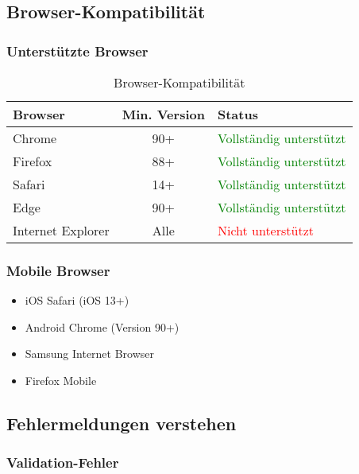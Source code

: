 \subsection{Browser-Kompatibilität}

\subsubsection{Unterstützte Browser}

\begin{table}[H]
    \centering
    \begin{tabular}{|l|c|l|}
        \hline
        \textbf{Browser} & \textbf{Min. Version} & \textbf{Status} \\
        \hline
        Chrome & 90+ & \textcolor{green}{Vollständig unterstützt} \\
        Firefox & 88+ & \textcolor{green}{Vollständig unterstützt} \\
        Safari & 14+ & \textcolor{green}{Vollständig unterstützt} \\
        Edge & 90+ & \textcolor{green}{Vollständig unterstützt} \\
        Internet Explorer & Alle & \textcolor{red}{Nicht unterstützt} \\
        \hline
    \end{tabular}
    \caption{Browser-Kompatibilität}
    \label{tab:browser-compatibility}
\end{table}

\subsubsection{Mobile Browser}

\begin{itemize}
    \item iOS Safari (iOS 13+)
    \item Android Chrome (Version 90+)
    \item Samsung Internet Browser
    \item Firefox Mobile
\end{itemize}

\subsection{Fehlermeldungen verstehen}

\subsubsection{Validation-Fehler}

